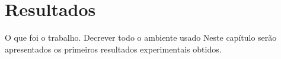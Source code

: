 \chapter{Resultados}


O que foi o trabalho. 
Decrever todo o ambiente usado
Neste capítulo serão apresentados os primeiros resultados experimentais obtidos.
